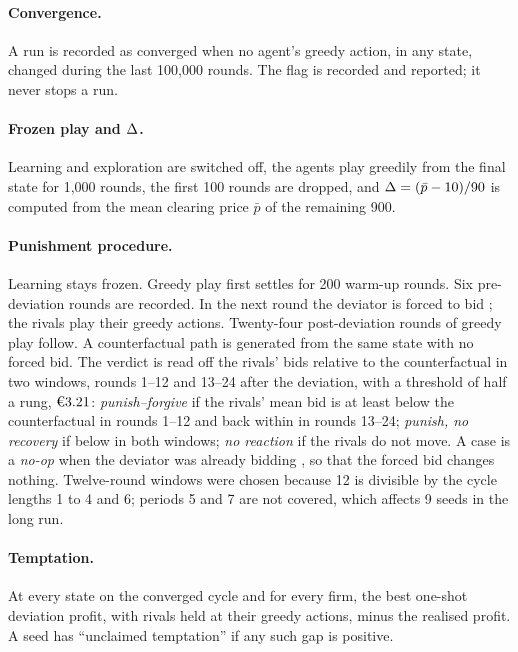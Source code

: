 \paragraph{Convergence.} A run is recorded as converged when no agent's greedy action, in any state, changed during the last 100,000 rounds. The flag is recorded and reported; it never stops a run.

\paragraph{Frozen play and $\Delta$.} Learning and exploration are switched off, the agents play greedily from the final state for 1,000 rounds, the first 100 rounds are dropped, and $\Delta = (\bar p - 10)/90$ is computed from the mean clearing price $\bar p$ of the remaining 900.

\paragraph{Punishment procedure.} Learning stays frozen. Greedy play first settles for 200 warm-up rounds. Six pre-deviation rounds are recorded. In the next round the deviator is forced to bid ; the rivals play their greedy actions. Twenty-four post-deviation rounds of greedy play follow. A counterfactual path is generated from the same state with no forced bid. The verdict is read off the rivals' bids relative to the counterfactual in two windows, rounds 1--12 and 13--24 after the deviation, with a threshold of half a rung, $\eur{3.21}$: \emph{punish--forgive} if the rivals' mean bid is at least  below the counterfactual in rounds 1--12 and back within  in rounds 13--24; \emph{punish, no recovery} if below in both windows; \emph{no reaction} if the rivals do not move. A case is a \emph{no-op} when the deviator was already bidding , so that the forced bid changes nothing. Twelve-round windows were chosen because 12 is divisible by the cycle lengths 1 to 4 and 6; periods 5 and 7 are not covered, which affects 9 seeds in the long run.

\paragraph{Temptation.} At every state on the converged cycle and for every firm, the best one-shot deviation profit, with rivals held at their greedy actions, minus the realised profit. A seed has ``unclaimed temptation'' if any such gap is positive.

